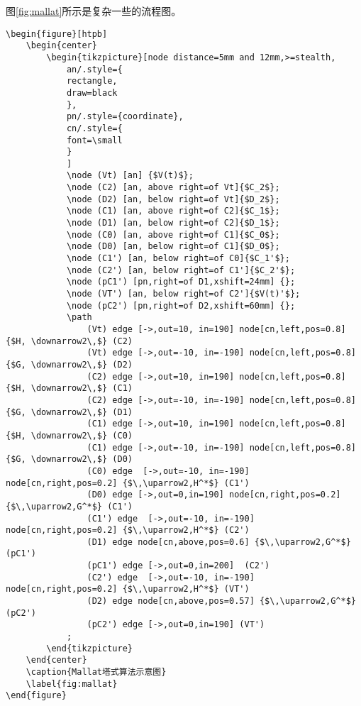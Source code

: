 图\ref{fig:mallat}所示是复杂一些的流程图。
\small{
\begin{verbatim}
\begin{figure}[htpb]
    \begin{center}
        \begin{tikzpicture}[node distance=5mm and 12mm,>=stealth,
            an/.style={
            rectangle,
            draw=black
            },
            pn/.style={coordinate},
            cn/.style={
            font=\small
            }
            ]
            \node (Vt) [an] {$V(t)$};
            \node (C2) [an, above right=of Vt]{$C_2$};
            \node (D2) [an, below right=of Vt]{$D_2$};
            \node (C1) [an, above right=of C2]{$C_1$};
            \node (D1) [an, below right=of C2]{$D_1$};
            \node (C0) [an, above right=of C1]{$C_0$};
            \node (D0) [an, below right=of C1]{$D_0$};
            \node (C1') [an, below right=of C0]{$C_1'$};
            \node (C2') [an, below right=of C1']{$C_2'$};
            \node (pC1') [pn,right=of D1,xshift=24mm] {};
            \node (VT') [an, below right=of C2']{$V(t)'$};
            \node (pC2') [pn,right=of D2,xshift=60mm] {};
            \path
                (Vt) edge [->,out=10, in=190] node[cn,left,pos=0.8] {$H, \downarrow2\,$} (C2)
                (Vt) edge [->,out=-10, in=-190] node[cn,left,pos=0.8] {$G, \downarrow2\,$} (D2)
                (C2) edge [->,out=10, in=190] node[cn,left,pos=0.8] {$H, \downarrow2\,$} (C1)
                (C2) edge [->,out=-10, in=-190] node[cn,left,pos=0.8] {$G, \downarrow2\,$} (D1)
                (C1) edge [->,out=10, in=190] node[cn,left,pos=0.8] {$H, \downarrow2\,$} (C0)
                (C1) edge [->,out=-10, in=-190] node[cn,left,pos=0.8] {$G, \downarrow2\,$} (D0)
                (C0) edge  [->,out=-10, in=-190] node[cn,right,pos=0.2] {$\,\uparrow2,H^*$} (C1')
                (D0) edge [->,out=0,in=190] node[cn,right,pos=0.2] {$\,\uparrow2,G^*$} (C1')
                (C1') edge  [->,out=-10, in=-190] node[cn,right,pos=0.2] {$\,\uparrow2,H^*$} (C2')
                (D1) edge node[cn,above,pos=0.6] {$\,\uparrow2,G^*$}(pC1')
                (pC1') edge [->,out=0,in=200]  (C2')
                (C2') edge  [->,out=-10, in=-190] node[cn,right,pos=0.2] {$\,\uparrow2,H^*$} (VT')
                (D2) edge node[cn,above,pos=0.57] {$\,\uparrow2,G^*$} (pC2')
                (pC2') edge [->,out=0,in=190] (VT')
            ;
        \end{tikzpicture}
    \end{center}
    \caption{Mallat塔式算法示意图}
    \label{fig:mallat}
\end{figure}
\end{verbatim}
}
